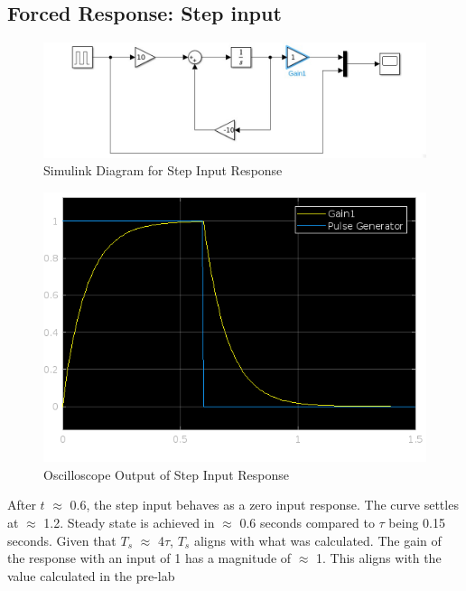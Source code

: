 \documentclass[12pt]{article}
\begin{document}
		\subsection{Forced Response: Step input}
			\begin{figure}[H]
				\centering
				\includegraphics[width=1\linewidth]{"Code/Fig/part2_2_slx.png"} %
				\caption{Simulink Diagram for Step Input Response}
				\label{fig:slx_step_input_diagram}
			\end{figure}	
			\begin{figure}[H]
				\centering
				\includegraphics[width=0.8\linewidth]{"Code/Fig/step_input_output.png"} 
				\caption{Oscilloscope Output of Step Input Response}
				\label{fig:slx_step_input_output}
			\end{figure}
			After $t$ $\approx$ 0.6, the step input behaves as a zero input response. The curve settles at $\approx$ 1.2. Steady state is achieved in $\approx$ 0.6 seconds compared to $\tau$ being 0.15 seconds. Given that $T_{s}$ $\approx$ 4$\tau$, $T_{s}$ aligns with what was calculated.
			The gain of the response with an input of 1 has a magnitude of $\approx$ 1. This aligns with the value calculated in the pre-lab
\end{document}
